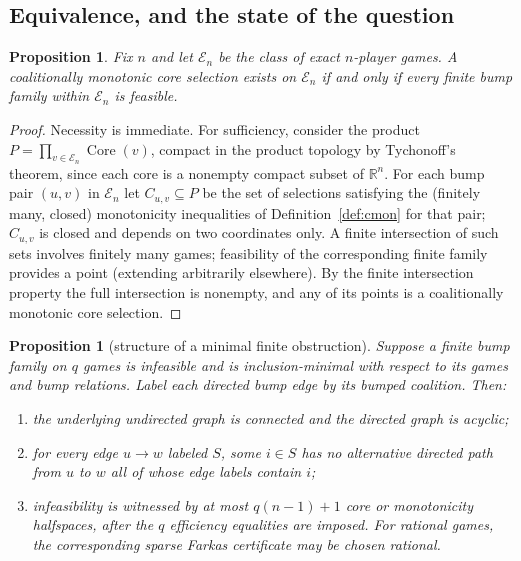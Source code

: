 \documentclass[11pt]{article}
\newtheorem{proposition}[theorem]{Proposition}
\newcommand{\R}{\mathbb{R}}
\newcommand{\core}{\operatorname{Core}}
\begin{document}
\subsection{Equivalence, and the state of the question}

\begin{proposition}\label{prop:compact}
Fix $n$ and let $\mathcal{E}_n$ be the class of exact $n$-player games. A
coalitionally monotonic core selection exists on $\mathcal{E}_n$ if and only
if every finite bump family within $\mathcal{E}_n$ is feasible.
\end{proposition}

\begin{proof}
Necessity is immediate. For sufficiency, consider the product
$P=\prod_{v\in\mathcal{E}_n}\core(v)$, compact in the product topology by
Tychonoff's theorem, since each core is a nonempty compact subset of
$\R^n$. For each bump pair $(u,v)$ in $\mathcal{E}_n$ let
$C_{u,v}\subseteq P$ be the set of selections satisfying the (finitely many,
closed) monotonicity inequalities of Definition~\ref{def:cmon} for that
pair; $C_{u,v}$ is closed and depends on two coordinates only. A finite
intersection of such sets involves finitely many games; feasibility of the
corresponding finite family provides a point (extending arbitrarily
elsewhere). By the finite intersection property the full intersection is
nonempty, and any of its points is a coalitionally monotonic core selection.
\end{proof}

\begin{proposition}[structure of a minimal finite obstruction]
\label{prop:minimal-structure}
Suppose a finite bump family on $q$ games is infeasible and is
inclusion-minimal with respect to its games and bump relations. Label each
directed bump edge by its bumped coalition. Then:
\begin{enumerate}[label=(\roman*),leftmargin=2em]
\item the underlying undirected graph is connected and the directed graph is
acyclic;
\item for every edge $u\to w$ labeled $S$, some $i\in S$ has no alternative
directed path from $u$ to $w$ all of whose edge labels contain $i$;
\item infeasibility is witnessed by at most $q(n-1)+1$ core or monotonicity
halfspaces, after the $q$ efficiency equalities are imposed. For rational
games, the corresponding sparse Farkas certificate may be chosen rational.
\end{enumerate}
\end{proposition}
\end{document}

